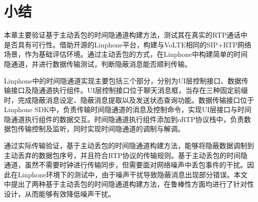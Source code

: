 \section{小结}
\label{chap:linphone:conclude}

本章主要验证基于主动丢包的时间隐通道构建方法，测试其在真实的RTP通话中是否具有可行性。借助开源的Linphone平台，构建与VoLTE相同的SIP+RTP网络场景，作为基础评估环境。通过主动丢包的方式，在Linphone中构建简单的时间隐通道，并进行数据传输测试，判断隐蔽消息能否顺利传输。

Linphone中的时间隐通道实现主要包括三个部分，分别为UI层控制接口、数据传输接口及隐通道执行组件。UI层控制接口位于聊天消息框，当存在三种固定前缀时，完成隐蔽消息设定、隐蔽消息提取以及发送状态查询功能。数据传输接口位于Linphone SDK中，负责传输时间隐通道的消息及控制命令，实现UI层接口与时间隐通道执行组件的数据交互。时间隐通道执行组件添加到oRTP协议栈中，负责数据包传输控制及监听，同时实现时间隐通道的调制与解调。

通过实际传输验证，基于主动丢包的时间隐通道构建方法，能够将隐蔽数据调制到主动丢弃的数据包序号，并且符合RTP协议的传输规则。基于主动丢包的时间隐通道，虽然不需要时钟进行传输同步，但需要面对网络噪声中丢包事件的干扰。因此在Linphone环境下的测试中，由于噪声干扰导致隐蔽消息出现部分错误。本文中提出了两种基于主动丢包的时间隐通道构建方法，在鲁棒性方面均进行了针对性设计，从而能够有效降低噪声干扰。